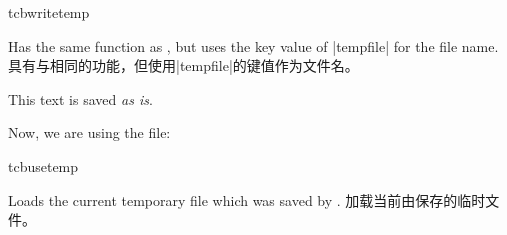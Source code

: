 \begin{docEnvironment}{tcbwritetemp}{}
\begin{stripedbox}
Has the same function as , but uses the key value
of |tempfile| for the file name.
\tcblower
具有与相同的功能，但使用|tempfile|的键值作为文件名。
\end{stripedbox}

\begin{dispExample}
\begin{tcbwritetemp}
  This text is saved \textit{as is}.
\end{tcbwritetemp}

Now, we are using the file:\par
\tcbusetemp
\end{dispExample}
\end{docEnvironment}


\begin{docCommand}{tcbusetemp}{}
\begin{stripedbox}
Loads the current temporary file which was saved by .
\tcblower
加载当前由保存的临时文件。
\end{stripedbox}
\end{docCommand}



